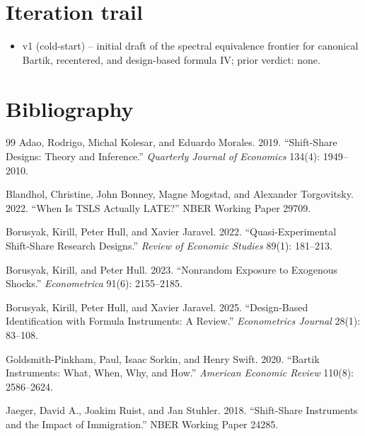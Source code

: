 \documentclass[11pt]{article}
\theoremstyle{definition}
\theoremstyle{plain}
\theoremstyle{remark}
\begin{document}
\section{Iteration trail}
\begin{itemize}[leftmargin=*]
\item v1 (cold-start) -- initial draft of the spectral equivalence frontier for canonical Bartik, recentered, and design-based formula IV; prior verdict: none.
\end{itemize}

\section*{Bibliography}
\begin{thebibliography}{99}
Adao, Rodrigo, Michal Kolesar, and Eduardo Morales. 2019.
``Shift-Share Designs: Theory and Inference.''
\emph{Quarterly Journal of Economics} 134(4): 1949--2010.

Blandhol, Christine, John Bonney, Magne Mogstad, and Alexander Torgovitsky. 2022.
``When Is TSLS Actually LATE?''
NBER Working Paper 29709.

Borusyak, Kirill, Peter Hull, and Xavier Jaravel. 2022.
``Quasi-Experimental Shift-Share Research Designs.''
\emph{Review of Economic Studies} 89(1): 181--213.

Borusyak, Kirill, and Peter Hull. 2023.
``Nonrandom Exposure to Exogenous Shocks.''
\emph{Econometrica} 91(6): 2155--2185.

Borusyak, Kirill, Peter Hull, and Xavier Jaravel. 2025.
``Design-Based Identification with Formula Instruments: A Review.''
\emph{Econometrics Journal} 28(1): 83--108.

Goldsmith-Pinkham, Paul, Isaac Sorkin, and Henry Swift. 2020.
``Bartik Instruments: What, When, Why, and How.''
\emph{American Economic Review} 110(8): 2586--2624.

Jaeger, David A., Joakim Ruist, and Jan Stuhler. 2018.
``Shift-Share Instruments and the Impact of Immigration.''
NBER Working Paper 24285.
\end{thebibliography}
\end{document}
